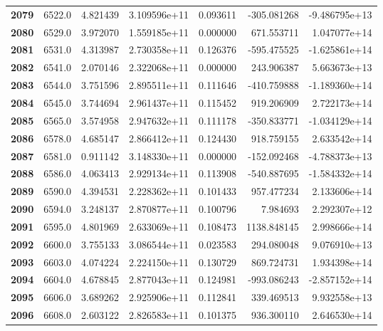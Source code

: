 \documentclass{report}[12pt]
\begin{document}
\begin{center}
\begin{tabular}{lrrrrrr}
\textbf{2079} &         6522.0 &   4.821439 &  3.109596e+11 &    0.093611 &  -305.081268 & -9.486795e+13 \\
\textbf{2080} &         6529.0 &   3.972070 &  1.559185e+11 &    0.000000 &   671.553711 &  1.047077e+14 \\
\textbf{2081} &         6531.0 &   4.313987 &  2.730358e+11 &    0.126376 &  -595.475525 & -1.625861e+14 \\
\textbf{2082} &         6541.0 &   2.070146 &  2.322068e+11 &    0.000000 &   243.906387 &  5.663673e+13 \\
\textbf{2083} &         6544.0 &   3.751596 &  2.895511e+11 &    0.111646 &  -410.759888 & -1.189360e+14 \\
\textbf{2084} &         6545.0 &   3.744694 &  2.961437e+11 &    0.115452 &   919.206909 &  2.722173e+14 \\
\textbf{2085} &         6565.0 &   3.574958 &  2.947632e+11 &    0.111178 &  -350.833771 & -1.034129e+14 \\
\textbf{2086} &         6578.0 &   4.685147 &  2.866412e+11 &    0.124430 &   918.759155 &  2.633542e+14 \\
\textbf{2087} &         6581.0 &   0.911142 &  3.148330e+11 &    0.000000 &  -152.092468 & -4.788373e+13 \\
\textbf{2088} &         6586.0 &   4.063413 &  2.929134e+11 &    0.113908 &  -540.887695 & -1.584332e+14 \\
\textbf{2089} &         6590.0 &   4.394531 &  2.228362e+11 &    0.101433 &   957.477234 &  2.133606e+14 \\
\textbf{2090} &         6594.0 &   3.248137 &  2.870877e+11 &    0.100796 &     7.984693 &  2.292307e+12 \\
\textbf{2091} &         6595.0 &   4.801969 &  2.633069e+11 &    0.108473 &  1138.848145 &  2.998666e+14 \\
\textbf{2092} &         6600.0 &   3.755133 &  3.086544e+11 &    0.023583 &   294.080048 &  9.076910e+13 \\
\textbf{2093} &         6603.0 &   4.074224 &  2.224150e+11 &    0.130729 &   869.724731 &  1.934398e+14 \\
\textbf{2094} &         6604.0 &   4.678845 &  2.877043e+11 &    0.124981 &  -993.086243 & -2.857152e+14 \\
\textbf{2095} &         6606.0 &   3.689262 &  2.925906e+11 &    0.112841 &   339.469513 &  9.932558e+13 \\
\textbf{2096} &         6608.0 &   2.603122 &  2.826583e+11 &    0.101375 &   936.300110 &  2.646530e+14 \\

\end{tabular}
\end{center}
\end{document}
